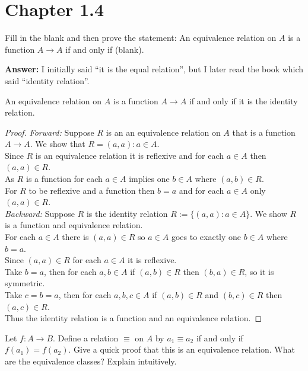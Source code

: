 \documentclass{article}
\begin{document}
\section{Chapter 1.4}
\setcounter{problem}{4}
\begin{problem} %
Fill in the blank and then prove the statement: An equivalence relation on $A$ is a function $A \rightarrow A$ if and only if (blank).
\end{problem}

\textbf{Answer:}
I initially said ``it is the equal relation'', but I later read the book which said ``identity relation''.

\begin{thm}
An equivalence relation on $A$ is a function $A \rightarrow A$ if and only if it is the identity relation.
\end{thm}
\begin{proof}
    \textit{Forward:} Suppose $R$ is an an equivalence relation on $A$ that is a function $A \rightarrow A$. We show that $R = (a,a): a \in A$. \\
    Since $R$ is an equivalence relation it is reflexive and for each $a \in A$ then $(a,a) \in R$.\\
    As $R$ is a function for each $a \in A$ implies one $b \in A$ where $(a,b) \in R$.\\
    For $R$ to be reflexive and a function then $b = a$ and for each $a \in A$ only $(a,a) \in R$.\\
    \textit{Backward:} Suppose $R$ is the identity relation $R := \{(a,a):a \in A\}$. We show $R$ is a function and equivalence relation.\\
    For each $a \in A$ there is $(a, a) \in R$ so $a \in A$ goes to exactly one $b \in A$ where $b = a$.\\
    Since $(a,a) \in R$ for each $a \in A$ it is reflexive.\\
    Take $b = a$, then for each $a, b \in A$ if $(a, b) \in R$ then $(b, a) \in R$, so it is symmetric.\\
    Take $c = b = a$, then for each $a, b, c \in A$ if $(a, b) \in R$ and $(b, c) \in R$ then $(a, c) \in R$.\\
    Thus the identity relation is a function and an equivalence relation.
\end{proof}

\begin{problem} %
Let $f: A \rightarrow B$. Define a relation $\equiv$ on $A$ by $a_1 \equiv a_2$ if and only if $f(a_1) = f(a_2)$. Give a quick proof that this is an equivalence relation. What are the equivalence classes? Explain intuitively.
\end{problem}
\end{document}
